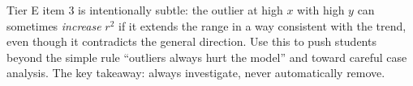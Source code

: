 \documentclass[10pt]{article}
\begin{document}
\begin{teachernote}
Tier E item 3 is intentionally subtle: the outlier at high $x$ with high $y$ can sometimes
\emph{increase} $r^2$ if it extends the range in a way consistent with the trend, even though
it contradicts the general direction. Use this to push students beyond the simple rule ``outliers
always hurt the model'' and toward careful case analysis. The key takeaway: always investigate,
never automatically remove.
\end{teachernote}
\end{document}
